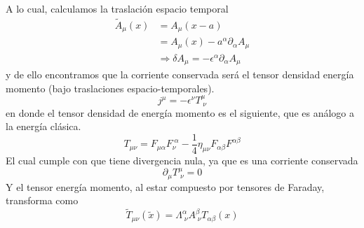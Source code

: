 \documentclass[../main.tex]{subfiles}
\begin{document}
A lo cual, calculamos la traslación espacio temporal
\begin{align*}
  \tilde{{A}}_\mu(x) & = A_\mu(x-a)  \\
  & = A_\mu(x) - a^\alpha \partial_\alpha A_\mu \\
  &\Rightarrow \delta A_\mu = -\epsilon^\alpha \partial_\alpha A_\mu 
\end{align*}
y de ello encontramos que la corriente conservada será el tensor densidad energía momento (bajo traslaciones espacio-temporales).
\begin{equation}
  j^\mu = -\epsilon^\nu T_{\;\nu}^\mu
 \end{equation}
 en donde el tensor densidad de energía momento es el siguiente, que es análogo a la energía clásica.
 \begin{equation}
   T_{\mu \nu} = F_{\mu \alpha} F_\nu^{\;\alpha} - \frac{1}{4}\eta_{\mu \nu} F_{\alpha \beta} F^{\alpha \beta}
  \end{equation}
  El cual cumple con que tiene divergencia nula, ya que es una corriente conservada
  \begin{equation}
    \partial_\mu T^\mu_{\;\nu} = 0
   \end{equation}
Y el tensor energía momento, al estar compuesto por tensores de Faraday, transforma como
\begin{equation}
  \tilde{T}_{\mu \nu}(\tilde{x}) = \Lambda^\alpha_{\;\nu} A^\beta_{\;\nu}T_{\alpha \beta}(x)
 \end{equation}
\end{document}
